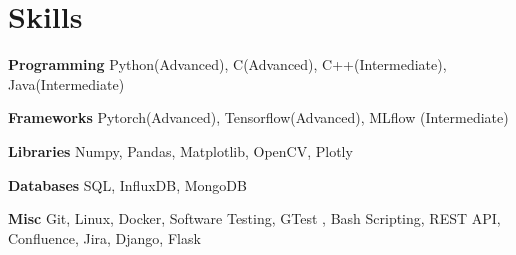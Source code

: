
\section{Skills}
  \vspace{2pt}
  \resumeSubHeadingListStart
    \small{\item{

    \textbf{\color{MidnightBlue}Programming}{ Python(Advanced), C(Advanced), C++(Intermediate), Java(Intermediate)} \\ \vspace{3pt} %

    \textbf{\color{MidnightBlue}Frameworks}{ Pytorch(Advanced), Tensorflow(Advanced), MLflow (Intermediate)}\\ \vspace{3pt} %

    \textbf{\color{MidnightBlue}Libraries}{ Numpy, Pandas, Matplotlib, OpenCV, Plotly} \\ \vspace{3pt} %


    \textbf{\color{MidnightBlue}Databases}{ SQL, InfluxDB, MongoDB} \\ \vspace{3pt}

    \textbf{\color{MidnightBlue}Misc}{ Git, Linux, Docker, Software Testing, GTest , Bash Scripting, REST API, Confluence, Jira, Django, Flask} \\ \vspace{3pt}
            
    }}
  \resumeSubHeadingListEnd
